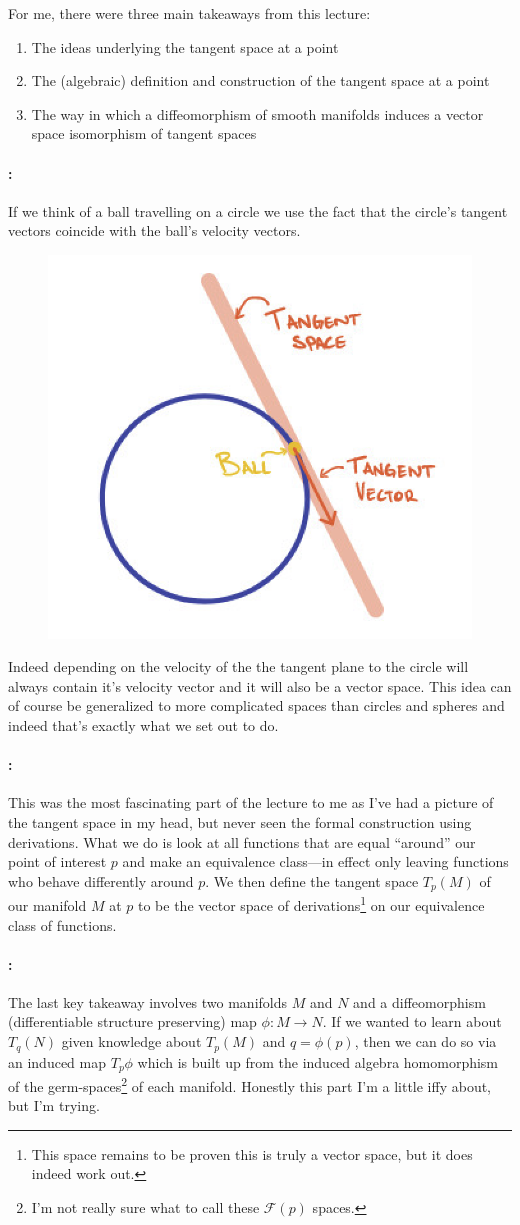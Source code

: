 \documentclass{homework}
\begin{document}
For me, there were three main takeaways from this lecture:
\begin{enumerate}
	\item The ideas underlying the tangent space at a point \label{it:idea}
	\item The (algebraic) definition and construction of the tangent space at a point \label{it:alg}
	\item The way in which a diffeomorphism of smooth manifolds induces a vector space isomorphism of tangent spaces \label{it:diff}
\end{enumerate}

\paragraph{:}
If we think of a ball travelling on a circle we use the fact that the circle's tangent vectors coincide with the ball's velocity vectors.
\begin{figure}[h]
	\centering
	\includegraphics[width=.3\textwidth]{circle.png}
\end{figure}
Indeed depending on the velocity of the the tangent plane to the circle will always contain it's velocity vector and it will also be a vector space.
This idea can of course be generalized to more complicated spaces than circles and spheres and indeed that's exactly what we set out to do.

\paragraph{:}
This was the most fascinating part of the lecture to me as I've had a picture of the tangent space in my head, but never seen the formal construction using derivations.
What we do is look at all functions that are equal ``around'' our point of interest $p$ and make an equivalence class---in effect only leaving functions who behave differently around $p$.
We then define the tangent space $T_p(M)$ of our manifold $M$ at $p$ to be the vector space of derivations\footnote{This space remains to be proven this is truly a vector space, but it does indeed work out.} on our equivalence class of functions.

\paragraph{:}
The last key takeaway involves two manifolds $M$ and $N$ and a diffeomorphism (differentiable structure preserving) map $\phi: M \to N$.
If we wanted to learn about $T_q(N)$ given knowledge about $T_p(M)$ and $q = \phi(p)$, then we can do so via an induced map $T_p\phi$ which is built up from the induced algebra homomorphism of the germ-spaces\footnote{I'm not really sure what to call these $\mathcal{F}(p)$ spaces.} of each manifold.
Honestly this part I'm a little iffy about, but I'm trying.
\end{document}
